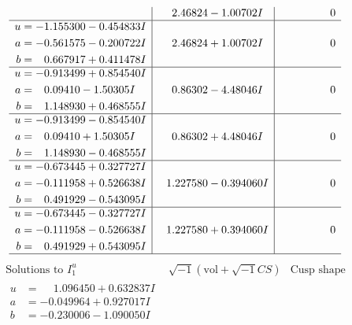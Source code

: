 \documentclass[1p]{elsarticle_modified}
\theoremstyle{definition}
\newcommand{\I}{\sqrt{-1}}
\begin{document}
$$\begin{array}{c|c|c}
 & \phantom{-}2.46824 - 1.00702 I & \phantom{-0.000000 } 0 \\ \hline\begin{aligned}
u &= -1.155300 - 0.454833 I \\
a &= -0.561575 - 0.200722 I \\
b &= \phantom{-}0.667917 + 0.411478 I\end{aligned}
 & \phantom{-}2.46824 + 1.00702 I & \phantom{-0.000000 } 0 \\ \hline\begin{aligned}
u &= -0.913499 + 0.854540 I \\
a &= \phantom{-}0.09410 - 1.50305 I \\
b &= \phantom{-}1.148930 + 0.468555 I\end{aligned}
 & \phantom{-}0.86302 - 4.48046 I & \phantom{-0.000000 } 0 \\ \hline\begin{aligned}
u &= -0.913499 - 0.854540 I \\
a &= \phantom{-}0.09410 + 1.50305 I \\
b &= \phantom{-}1.148930 - 0.468555 I\end{aligned}
 & \phantom{-}0.86302 + 4.48046 I & \phantom{-0.000000 } 0 \\ \hline\begin{aligned}
u &= -0.673445 + 0.327727 I \\
a &= -0.111958 + 0.526638 I \\
b &= \phantom{-}0.491929 - 0.543095 I\end{aligned}
 & \phantom{-}1.227580 - 0.394060 I & \phantom{-0.000000 } 0 \\ \hline\begin{aligned}
u &= -0.673445 - 0.327727 I \\
a &= -0.111958 - 0.526638 I \\
b &= \phantom{-}0.491929 + 0.543095 I\end{aligned}
 & \phantom{-}1.227580 + 0.394060 I & \phantom{-0.000000 } 0\\
 \hline 
 \end{array}$$\newpage$$\begin{array}{c|c|c}  
\text{Solutions to }I^u_{1}& \I (\text{vol} + \sqrt{-1}CS) & \text{Cusp shape}\\
 \hline 
\begin{aligned}
u &= \phantom{-}1.096450 + 0.632837 I \\
a &= -0.049964 + 0.927017 I \\
b &= -0.230006 - 1.090050 I\end{aligned}

\end{array}$$
\end{document}
